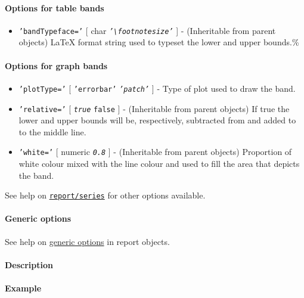 \paragraph{Options for table bands}\label{options-for-table-bands}

\begin{itemize}
\itemsep1pt\parskip0pt
\item
  \texttt{'bandTypeface='} {[} char \textbar{}
  \emph{\texttt{'\textbackslash{}footnotesize'}} {]} - (Inheritable from
  parent objects) LaTeX format string used to typeset the lower and
  upper bounds.\%
\end{itemize}

\paragraph{Options for graph bands}\label{options-for-graph-bands}

\begin{itemize}
\item
  \texttt{'plotType='} {[} \texttt{'errorbar'} \textbar{}
  \emph{\texttt{'patch'}} {]} - Type of plot used to draw the band.
\item
  \texttt{'relative='} {[} \emph{\texttt{true}} \textbar{}
  \texttt{false} {]} - (Inheritable from parent objects) If true the
  lower and upper bounds will be, respectively, subtracted from and
  added to to the middle line.
\item
  \texttt{'white='} {[} numeric \textbar{} \emph{\texttt{0.8}} {]} -
  (Inheritable from parent objects) Proportion of white colour mixed
  with the line colour and used to fill the area that depicts the band.
\end{itemize}

See help on \href{report/series}{\texttt{report/series}} for other
options available.

\paragraph{Generic options}\label{generic-options}

See help on \href{report/Contents}{generic options} in report objects.

\paragraph{Description}\label{description}

\paragraph{Example}\label{example}


